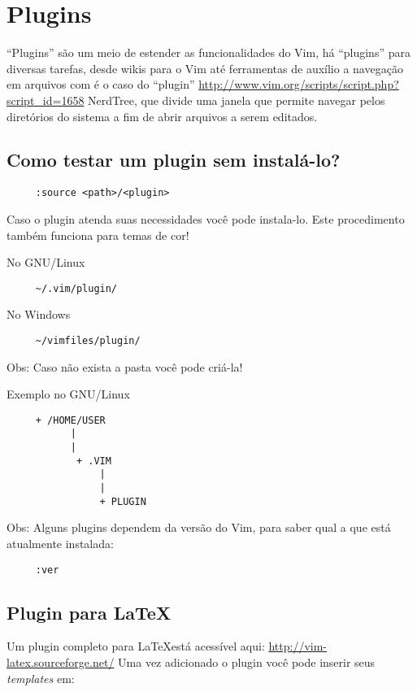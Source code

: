 \chapter{Plugins}\label{Plugins}

``Plugins'' são um meio de estender as funcionalidades do Vim, há
``plugins'' para diversas tarefas, desde wikis para o Vim até
ferramentas de auxílio a navegação em arquivos com é o caso do
``plugin'' \url{http://www.vim.org/scripts/script.php?script\_id=1658}
NerdTree, que divide uma janela que permite navegar pelos diretórios
do sistema a fim de abrir arquivos a serem editados.

\section{Como testar um plugin sem instalá-lo?}
\label{Como testar um plugin sem instala-lo?}

\begin{verbatim}
     :source <path>/<plugin>
\end{verbatim}

Caso o plugin atenda suas necessidades você pode instala-lo. Este
procedimento também funciona para temas de cor!



No GNU/Linux
\begin{verbatim}
     ~/.vim/plugin/
\end{verbatim}

No Windows

\begin{verbatim}
     ~/vimfiles/plugin/
\end{verbatim}

Obs: Caso não exista a pasta você pode criá-la!

Exemplo no GNU/Linux

\begin{verbatim}
     + /HOME/USER
           |
           |
            + .VIM
                |
                |
                + PLUGIN
\end{verbatim}

Obs: Alguns plugins dependem da versão do Vim, para saber qual
a que está atualmente instalada:

\begin{verbatim}
     :ver
\end{verbatim}

\section{Plugin para \LaTeX}
\label{Plugin para LaTeX}
Um plugin completo para \LaTeX está acessível aqui: \url{http://vim-latex.sourceforge.net/}
Uma vez adicionado o plugin você pode inserir seus {\em templates}
em:

